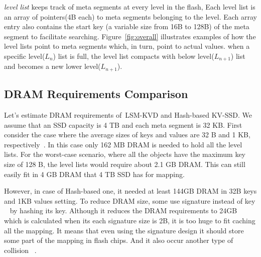 \documentclass{abstract_hutech}
\newcommand{\ours}{LSM-KVD}
\begin{document}
\textit{level list} keeps track of meta segments at every level in the flash, Each level list is an array of pointers(4B each)
to meta segments belonging to the level. 
Each array entry also contains the start key (a variable size from 16B to 128B) of the meta segment to facilitate searching.
Figure~\ref{fig:overall} illustrates examples of how the level lists point to 
meta segments which, in turn, point to actual values.
when a specific level({$L_n$}) list is full, the level list compacts with below level({$L_{n+1}$}) list and becomes a new lower level({$L_{n+1}$}).

\vspace{-5pt}
\subsection{DRAM Requirements Comparison}\vspace{-5pt}
Let's estimate DRAM requirements of~\ours{} and Hash-based KV-SSD.
We assume that an SSD capacity is 4 TB and each meta segment is 32 KB.
First consider the case where the average sizes of keys and values are 32 B and 1 KB,
respectively~\cite{kvsize}. In this case only 162 MB DRAM is needed to hold all the level lists.
For the worst-case scenario, where all the objects have the maximum key size of 128 B,
the level lists would require about 2.1 GB DRAM. 
This can still easily fit in 4 GB DRAM that 4 TB SSD has for mapping.

However, in case of Hash-based one, it needed at least 144GB DRAM in 32B keys and 1KB values setting.
To reduce DRAM size, some use signature instead of key ~\cite{bluedbm} by hashing its key.
Although it reduces the DRAM requirements to 24GB which is calculated when its each signature size is 2B, it is too huge to fit caching all the mapping.
It means that even using the signature design it should store some part of the mapping in flash chips.
And it also occur another type of collision ~.
\end{document}
